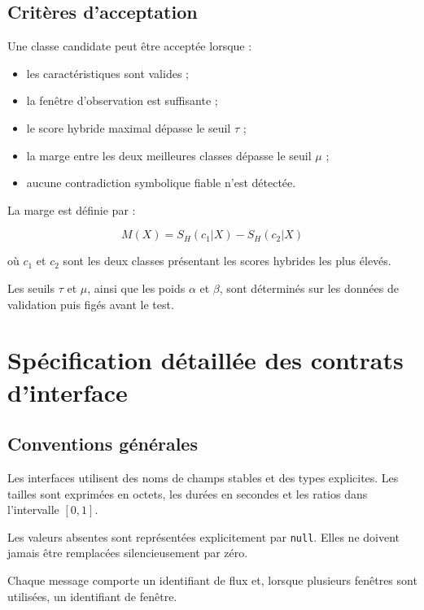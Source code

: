 \subsection{Critères d'acceptation}

Une classe candidate peut être acceptée lorsque :

\begin{itemize}
    \item les caractéristiques sont valides ;
    \item la fenêtre d'observation est suffisante ;
    \item le score hybride maximal dépasse le seuil $\tau$ ;
    \item la marge entre les deux meilleures classes dépasse
    le seuil $\mu$ ;
    \item aucune contradiction symbolique fiable n'est détectée.
\end{itemize}

La marge est définie par :

\[
M(X)=S_H(c_1|X)-S_H(c_2|X)
\]

où $c_1$ et $c_2$ sont les deux classes présentant
les scores hybrides les plus élevés.

Les seuils $\tau$ et $\mu$, ainsi que les poids
$\alpha$ et $\beta$, sont déterminés sur les données
de validation puis figés avant le test.

\section{Spécification détaillée des contrats d'interface}

\subsection{Conventions générales}

Les interfaces utilisent des noms de champs stables
et des types explicites. Les tailles sont exprimées
en octets, les durées en secondes et les ratios dans
l'intervalle $[0,1]$.

Les valeurs absentes sont représentées explicitement
par \texttt{null}. Elles ne doivent jamais être remplacées
silencieusement par zéro.

Chaque message comporte un identifiant de flux et,
lorsque plusieurs fenêtres sont utilisées, un identifiant
de fenêtre.

